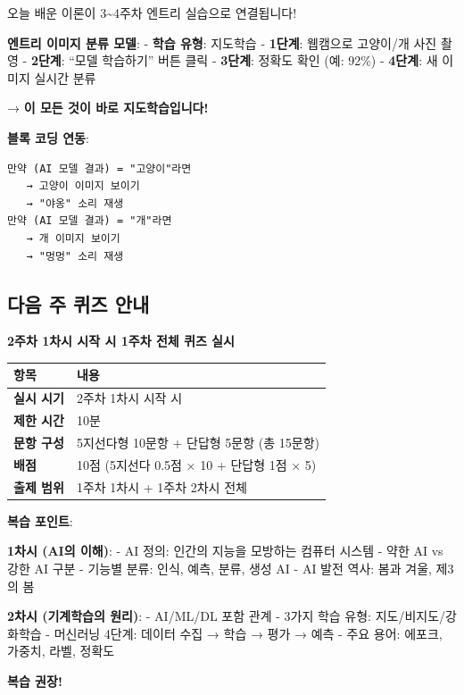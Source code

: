 \documentclass[a4paper, 11pt]{article}
\begin{document}
오늘 배운 이론이 3\textasciitilde4주차 엔트리 실습으로 연결됩니다!

\textbf{엔트리 이미지 분류 모델}: - \textbf{학습 유형}: 지도학습 -
\textbf{1단계}: 웹캠으로 고양이/개 사진 촬영 - \textbf{2단계}: ``모델
학습하기'' 버튼 클릭 - \textbf{3단계}: 정확도 확인 (예: 92\%) -
\textbf{4단계}: 새 이미지 실시간 분류

→ \textbf{이 모든 것이 바로 지도학습입니다!}

\textbf{블록 코딩 연동}:

\begin{verbatim}
만약 (AI 모델 결과) = "고양이"라면
   → 고양이 이미지 보이기
   → "야옹" 소리 재생
만약 (AI 모델 결과) = "개"라면
   → 개 이미지 보이기
   → "멍멍" 소리 재생
\end{verbatim}

\hypertarget{uxb2e4uxc74c-uxc8fc-uxd034uxc988-uxc548uxb0b4}{%
\subsection{다음 주 퀴즈
안내}\label{uxb2e4uxc74c-uxc8fc-uxd034uxc988-uxc548uxb0b4}}

\textbf{2주차 1차시 시작 시 1주차 전체 퀴즈 실시}

\begin{longtable}{p{4cm}p{10cm}}
\toprule\noalign{}
항목 & 내용 \\
\midrule\noalign{}
\endhead
\bottomrule\noalign{}
\endlastfoot
\textbf{실시 시기} & 2주차 1차시 시작 시 \\
\textbf{제한 시간} & 10분 \\
\textbf{문항 구성} & 5지선다형 10문항 + 단답형 5문항 (총 15문항) \\
\textbf{배점} & 10점 (5지선다 0.5점 × 10 + 단답형 1점 × 5) \\
\textbf{출제 범위} & 1주차 1차시 + 1주차 2차시 전체 \\
\end{longtable}

\textbf{복습 포인트}:

\textbf{1차시 (AI의 이해)}: - AI 정의: 인간의 지능을 모방하는 컴퓨터
시스템 - 약한 AI vs 강한 AI 구분 - 기능별 분류: 인식, 예측, 분류, 생성
AI - AI 발전 역사: 봄과 겨울, 제3의 봄

\textbf{2차시 (기계학습의 원리)}: - AI/ML/DL 포함 관계 - 3가지 학습
유형: 지도/비지도/강화학습 - 머신러닝 4단계: 데이터 수집 → 학습 → 평가 →
예측 - 주요 용어: 에포크, 가중치, 라벨, 정확도

\textbf{복습 권장!} 
\end{document}

